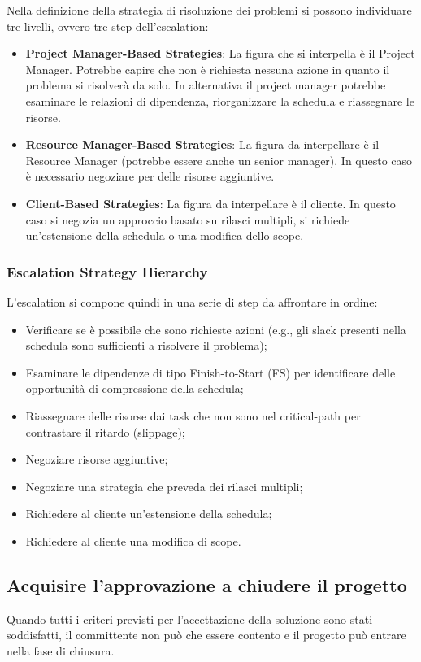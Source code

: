 \noindent Nella definizione della strategia di risoluzione dei problemi si possono individuare tre livelli, ovvero tre step dell'escalation:
\begin{itemize}
	\item \textbf{Project Manager-Based Strategies}: La figura che si interpella è il Project Manager. Potrebbe capire che non è richiesta nessuna azione in quanto il problema si risolverà da solo. In alternativa il project manager potrebbe esaminare le relazioni di dipendenza, riorganizzare la schedula e riassegnare le risorse.
	\item \textbf{Resource Manager-Based Strategies}: La figura da interpellare è il Resource Manager (potrebbe essere anche un senior manager). In questo caso è necessario negoziare per delle risorse aggiuntive.
	\item \textbf{Client-Based Strategies}: La figura da interpellare è il cliente. In questo caso si negozia un approccio basato su rilasci multipli, si richiede un’estensione della schedula o una modifica dello scope.
\end{itemize}

\subsubsection{Escalation Strategy Hierarchy}
L'escalation si compone quindi in una serie di step da affrontare in ordine:
\begin{itemize}
	\item Verificare se è possibile che sono richieste azioni (e.g., gli slack presenti nella schedula sono sufficienti a risolvere il problema);
	\item Esaminare le dipendenze di tipo Finish-to-Start (FS) per identificare delle opportunità di compressione della schedula;
	\item Riassegnare delle risorse dai task che non sono nel critical-path per contrastare il ritardo (slippage);
	\item Negoziare risorse aggiuntive;
	\item Negoziare una strategia che preveda dei rilasci multipli;
	\item Richiedere al cliente un’estensione della schedula;
	\item Richiedere al cliente una modifica di scope.
\end{itemize}

\subsection{Acquisire l’approvazione a chiudere il progetto}
Quando tutti i criteri previsti per l’accettazione della soluzione sono stati soddisfatti, il committente non può che essere contento e il progetto può entrare nella fase di chiusura.
